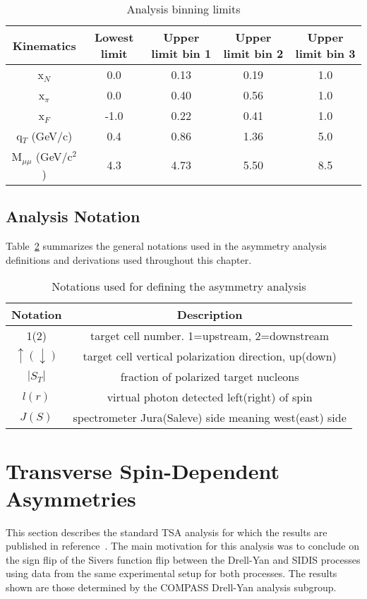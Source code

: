 \begin{table}[h!t]
  \centering
  \begin{tabular}{ |c|c|c|c|c| }
    \hline \textbf{Kinematics}& \textbf{Lowest limit}& \textbf{Upper limit bin
      1}& \textbf{Upper limit bin 2}& \textbf{Upper limit bin 3}\\ \hline
    
    x$_N$& 0.0& 0.13& 0.19& 1.0\\ \hline x$_{\pi}$& 0.0& 0.40& 0.56&
    1.0\\ \hline x$_F$& -1.0& 0.22& 0.41& 1.0\\ \hline q$_T$ (GeV/c)& 0.4& 0.86&
    1.36& 5.0\\ \hline M$_{\mu\mu}$ (GeV/c$^2$)& 4.3& 4.73& 5.50& 8.5 \\ \hline
    
  \end{tabular}
  \caption{Analysis binning limits}
  \label{tab::binning}
\end{table}

\subsection{Analysis Notation}
Table~\ref{tab::ANnotations} summarizes the general notations used in the
asymmetry analysis definitions and derivations used throughout this chapter.

\begin{table}[h!t]
  \centering
  \caption{Notations used for defining the asymmetry analysis}
  \label{tab::ANnotations}
  \begin{tabular}{ |c|c| }
    
    \hline \textbf{Notation}& \textbf{Description}
    \\ \hline 1(2)& target cell
    number. 1=upstream, 2=downstream \\ \hline
    $\uparrow(\downarrow)$ & target
    cell vertical polarization direction, up(down) \\ \hline
    $|S_T|$& fraction of
    polarized target nucleons \\ \hline
    $l(r)$ & virtual photon detected left(right) of spin \\ \hline
    $J(S)$ & spectrometer Jura(Saleve) side meaning west(east) side
    \\ \hline
    
  \end{tabular}
\end{table}

\section{Transverse Spin-Dependent Asymmetries} \label{sec::standTSA}
This section describes the standard TSA analysis for which the results are
published in reference~\cite{compassDYpaper}.  The main motivation for this
analysis was to conclude on the sign flip of the Sivers function flip between
the Drell-Yan and SIDIS processes using data from the same experimental setup
for both processes.  The results shown are those determined by the COMPASS
Drell-Yan analysis subgroup.

